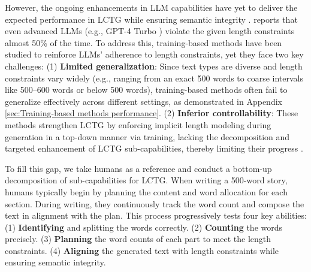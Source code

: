 However, the ongoing enhancements in LLM capabilities have yet to deliver the expected performance in LCTG while ensuring semantic integrity \cite{foster2024token,wang2024positionid,song2024hansel}. \citet{lift} reports that even advanced LLMs (e.g., GPT-4 Turbo \citep{gpt4}) violate the given length constraints almost 50\% of the time. To address this, training-based methods \citep{DisentDPO,lift,promptRein,ruler} have been studied to reinforce LLMs' adherence to length constraints, yet they face two key challenges: (1) \textbf{Limited generalization}: Since text types are diverse and length constraints vary widely (e.g., ranging from an exact 500 words to coarse intervals like 500–600 words or below 500 words), training-based methods often fail to generalize effectively across different settings, as demonstrated in Appendix \ref{sec:Training-based methods performance}. (2) \textbf{Inferior controllability}: These methods strengthen LCTG by enforcing implicit length modeling during generation in a top-down manner via training, lacking the decomposition and targeted enhancement of LCTG sub-capabilities, thereby limiting their progress \citep{retkowski2024zero}.

To fill this gap, we take humans as a reference and conduct a bottom-up decomposition of sub-capabilities for LCTG. When writing a 500-word story, humans typically begin by planning the content and word allocation for each section. During writing, they continuously track the word count and compose the text in alignment with the plan.
This process progressively tests four key abilities: (1) \textbf{Identifying} and splitting the words correctly. (2) \textbf{Counting} the words precisely. (3) \textbf{Planning} the word counts of each part to meet the length constraints. (4) \textbf{Aligning} the generated text with length constraints while ensuring semantic integrity.


